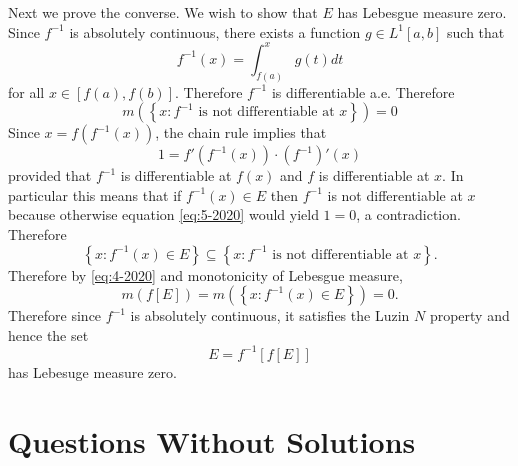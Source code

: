 \documentclass[answers]{exam}
\begin{document}
\begin{questions}
\begin{solution}
  Next we prove the converse. We wish to show that $E$ has Lebesgue measure zero. Since $f^{-1}$ is absolutely continuous, there exists a function $g\in L^{1}[a,b]$ such that
  \begin{equation*}
    f^{-1}(x) = \int_{f(a)}^{x}g(t)dt 
  \end{equation*}
  for all $x\in [f(a),f(b)]$. Therefore $f^{-1}$ is differentiable a.e. Therefore
  \begin{equation} \label{eq:4-2020}
    m \left( \left\{ x: f^{-1} \text{ is not differentiable at }x \right\} \right)  = 0
  \end{equation}
  Since $x = f(f^{-1}(x))$, the chain rule implies that
  \begin{equation} \label{eq:5-2020}
    1= f'(f^{-1}(x))\cdot (f^{-1})'(x)
  \end{equation}
  provided that $f^{-1}$ is differentiable at $f(x)$ and $f$ is differentiable
  at $x$. In particular this means that if $f^{-1}(x)\in E$ then $f^{-1}$ is not differentiable at $x$
  because otherwise equation \eqref{eq:5-2020} would yield $1=0$, a contradiction.
  Therefore
  \begin{equation*}
    \left\{ x: f^{-1}(x)\in E \right\} \subseteq  \left\{ x: f^{-1} \text{ is not differentiable at }x \right\}.
  \end{equation*}
  Therefore by \eqref{eq:4-2020} and monotonicity of Lebesgue measure,
  \begin{equation*}
    m(f[E])= m\left(\left\{ x:f^{-1}(x)\in E \right\}\right)=0.
  \end{equation*}
  Therefore since $f^{-1}$ is absolutely continuous, it satisfies the Luzin $N$
  property and hence the set
  \begin{equation*}
    E = f^{-1}[f[E]]
  \end{equation*}
  has Lebesuge measure zero.
\end{solution}







\newpage
\section{Questions Without Solutions}


\end{questions}
\end{document}
